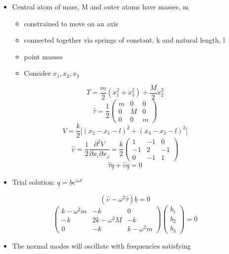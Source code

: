 \documentclass[a4paper,11pt,normalem]{article}
\begin{document}
\begin{example}

\begin{itemize}
\item
  Central atom of mass, M and outer atoms have masses, m
  \begin{itemize}
  \item
    constrained to move on an axis
  \item
    connected together via springs of constant, k and natural length, l
  \item
    point masses
  \item
    Consider \(x_1, x_2, x_3\)
  \end{itemize}
\end{itemize}

\[
    T = \frac{m}{2}(\dot{x}_{1}^2 + \dot{x}_{3}^2) + \frac{M}{2}\dot{x}_{2}^2
\] \[
    \hat{\tau} = \frac{1}{2}\begin{pmatrix}m & 0 & 0 \\ 0 & M & 0 \\ 0 & 0 & m \end{pmatrix} \]
\[
    V = \frac{k}{2}\Big[(x_2 - x_1 - l)^2 + (x_3 - x_2 - l)^2 \Big] \]
\[
    \hat{\upsilon} = \frac{1}{2} \frac{\partial^2 V}{\partial x_i \partial x_j} = \frac{k}{2} \begin{pmatrix} 1 & -1 & 0 \\ -1 & 2 & -1 \\ 0 & -1 & 1 \end{pmatrix} \]
\[
    \hat{\tau}\underline{\ddot{q}} + \hat{\upsilon}\underline{q} = \underline{0}
\]

\begin{itemize}
\item
  Trial solution: \(\underline{q} = \underline{b}e^{i\omega t}\)
\end{itemize}

\[
    (\hat{\upsilon} - \omega^2 \hat{\tau})\underline{b} = 0 \] \[
    \begin{pmatrix} k - \omega^2 m & -k & 0 \\ -k & 2k - \omega^2 M & -k \\ 0 & -k & k - \omega^2 m \end{pmatrix} \begin{pmatrix} b_1 \\ b_2 \\ b_3 \end{pmatrix} = 0
\]

\begin{itemize}
\item
  The normal modes will oscillate with frequencies satisfying
\end{itemize}


\end{example}
\end{document}
